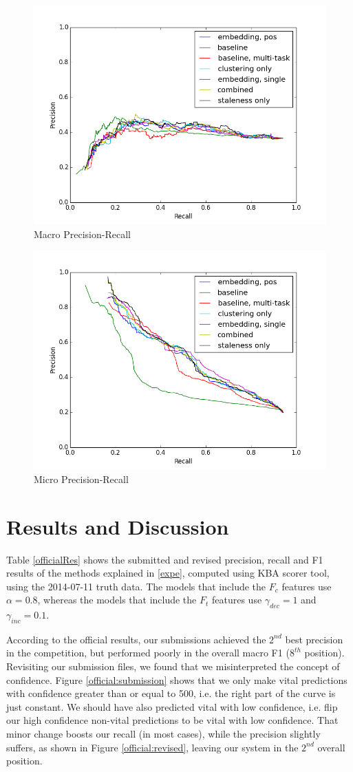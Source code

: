 \documentclass{article}
\begin{document}
\begin{figure}[tb]
\centering
\includegraphics[width=.45\textwidth,clip=true,trim=10mm 0mm 15mm 8mm]{fig/macroPrecisionRecall.png}
\caption{Macro Precision-Recall}
\label{macroPrecRecall}
\end{figure}

\begin{figure}[tb]
\centering
\includegraphics[width=.45\textwidth,clip=true,trim=10mm 0mm 15mm 8mm]{fig/microPrecisionRecall.png}
\caption{Micro Precision-Recall}
\label{microPrecRecall}
\end{figure}

\section{Results and Discussion}

Table \ref{officialRes} shows the submitted and revised precision, recall and F1 results of the methods explained in \ref{expe}, computed using KBA scorer tool, using the 2014-07-11 truth data. The models that include the $F_c$ features use $\alpha=0.8$, whereas the models that include the $F_t$ features use $\gamma_{dec}=1$ and $\gamma_{inc}=0.1$.

According to the official results, our submissions achieved the $2^{nd}$ best precision in the competition, but performed poorly in the overall macro F1 ($8^{th}$ position). Revisiting our submission files, we found that we misinterpreted the concept of confidence. Figure \ref{official:submission} shows that we only make vital predictions with confidence greater than or equal to 500, i.e. the right part of the curve is just constant. We should have also predicted vital with low confidence, i.e. flip our high confidence non-vital predictions to be vital with low confidence. That minor change boosts our recall (in most cases), while the precision slightly suffers, as shown in Figure \ref{official:revised}, leaving our system in the $2^{nd}$ overall position.
\end{document}
